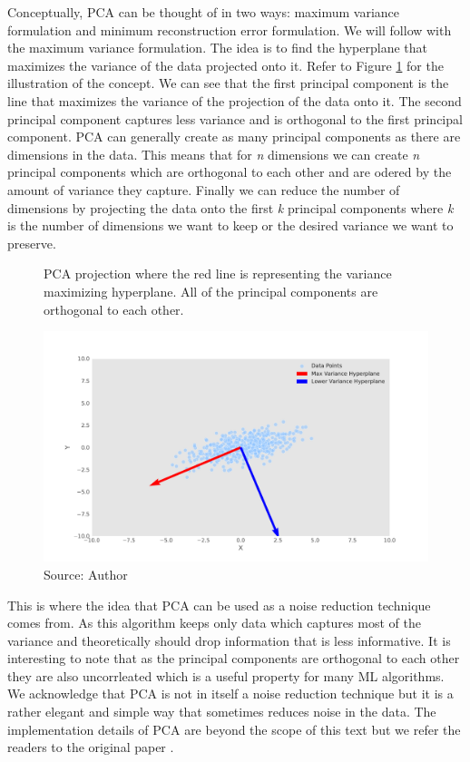 Conceptually, \ac{PCA} can be thought of in two ways: maximum variance formulation
and minimum reconstruction error formulation. We will follow with the maximum variance formulation.
The idea is to find the hyperplane that maximizes the variance of the data projected onto it.
Refer to Figure \ref{fig:pca} for the illustration of the concept. We can see
that the first principal component is the line that maximizes the variance of the projection
of the data onto it. The second principal component captures
less variance and is orthogonal to the first principal component. \ac{PCA} can
generally create as many principal components as there are dimensions in the data.
This means that for \textit{n} dimensions we can create \textit{n} principal components which
are orthogonal to each other and are odered by the amount of variance they capture. 
Finally we can reduce the number of dimensions by projecting the data onto the first \textit{k} principal components
where \textit{k} is the number of dimensions we want to keep or the desired variance 
we want to preserve.

\begin{figure}[!h]
    \centering
    \caption{\ac{PCA} projection where the red line
    is representing the variance maximizing hyperplane. All of the 
    principal components are orthogonal to each other.}
    \includegraphics[width=1\textwidth]{Figures/pca_plot.pdf}
    \caption*{Source: Author}
    \label{fig:pca}
\end{figure}

This is where the idea that \ac{PCA} can be used as a noise reduction technique comes from.
As this algorithm keeps only data which captures most of the variance
and theoretically should drop information that is less informative.
It is interesting to note that as the principal components are orthogonal to each other 
they are also uncorrleated which is a useful property for many \ac{ML} algorithms. 
We acknowledge that \ac{PCA} is not in itself a noise reduction technique
but it is a rather elegant and simple way that sometimes reduces noise in the data.
The implementation details of \ac{PCA} are beyond the scope of this text but we refer the readers
to the original paper \cite{Pearson1901}.





